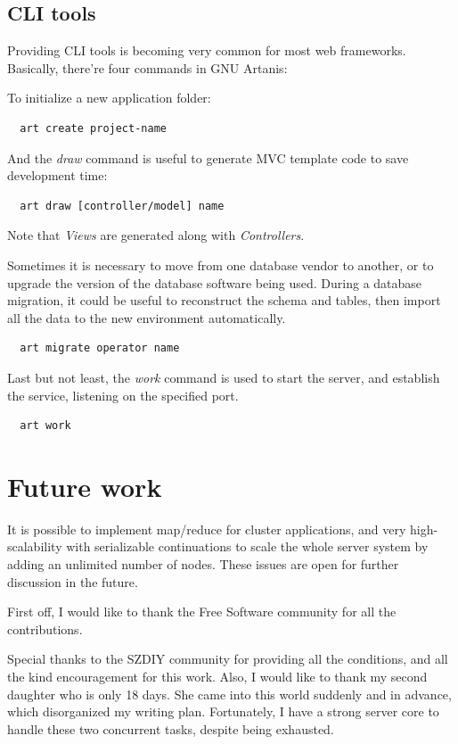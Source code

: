 \documentclass[numbers,numberedpars]{sigplanconf}
\begin{document}
\subsection{CLI tools} \label{CLI tools}

Providing CLI tools is becoming very common for most web frameworks.
Basically, there're four commands in GNU Artanis:

To initialize a new application folder:
\begin{lstlisting}
  art create project-name
\end{lstlisting}

And the {\it draw} command is useful to generate MVC template code to save development time:
\begin{lstlisting}
  art draw [controller/model] name
\end{lstlisting}
Note that {\it Views} are generated along with {\it Controllers}.

Sometimes it is necessary to move from one database vendor to another, or to upgrade the version of the database software being used. During a database migration, it could be useful to reconstruct the schema and tables, then import all the data to the new environment automatically.
\begin{lstlisting}
  art migrate operator name
\end{lstlisting}

Last but not least, the {\it work} command is used to start the server, and establish the service, listening on the specified port.
\begin{lstlisting}
  art work
\end{lstlisting}

\section{Future work}

It is possible to implement map/reduce for cluster applications, and very high-scalability with serializable continuations to scale the whole server system by adding an unlimited number of nodes. These issues are open for further discussion in the future.

\acks

First off, I would like to thank the Free Software community for all the contributions.

Special thanks to the SZDIY community for providing all the conditions, and all the kind encouragement for this work. Also, I would like to thank my second daughter who
is only 18 days. She came into this world suddenly and in advance, which disorganized my writing plan. Fortunately, I have a strong server core to handle these two concurrent tasks, despite being exhausted.





\softraggedright


\end{document}
